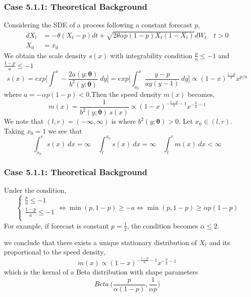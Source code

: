 \documentclass[aspectratio=169]{beamer}\usepackage[utf8]{inputenc}
\begin{document}
\begin{frame}\frametitle{ Case 5.1.1: Theoretical Background }
Considering the  SDE of a process following a constant forecast $p$,
\begin{equation}
\begin{split}
dX_t &= -\theta(X_t - p) dt + \sqrt{2 \theta \alpha p(1-p) X_t (1-X_t)} dW_t \quad t > 0 \\
X_0 & = x_0
\end{split}\label{main}
\end{equation}
We obtain the scale density $s(x)$ with integrability condition $\frac{p}{a} \leq -1 $ and $\frac{1-p}{a} \leq -1$
\begin{equation}
s(x) = exp \Big[ \int^x - \frac{2  a(y; \bm{\theta})}{b^2 (y; \bm{\theta} )}\ dy \Big] = exp \Big[ \int^x_{x_0}  \frac{y-p}{a y (y-1)}\ dy \Big]  \propto (1-x)^{\frac{1-p}{a}} x^{p/a}
\end{equation}
where $a= - \alpha p(1-p) <0$.Then the speed density $m(x)$ becomes, 
\begin{equation}
m(x) = \frac{1}{b^2 (y; \bm{\theta}) \  s(x)} \propto (1-x)^{-\frac{1-p}{a}-1} x^{-\frac{p}{a}-1}
\end{equation}
We note that $(l,r) = (-\infty, \infty)$ is where $b^2 (y; \bm{\theta} ) >0$. Let $x_0 \in (l,r)$. Taking $x_0=1$ we see that
\begin{equation}
\int_{x_0}^r s(x) \ dx = \infty \quad \int_{l}^{x_0} s(x) \ dx = \infty \quad \int_l^r m(x) \ dx < \infty
\end{equation}
\end{frame}

\begin{frame}\frametitle{ Case 5.1.1: Theoretical Background }
Under the condition,
\begin{equation}
\begin{cases}
\frac{p}{a} \leq -1\\
\frac{1-p}{a} \leq -1\\
\end{cases}\iff
\min (p, 1-p) \geq -a \iff  \min (p, 1-p) \geq \alpha p(1-p)
\end{equation}
For example, if forecast is constant $ p = \frac{1}{2}$, the condition becomes $\alpha \leq 2$.

we conclude that there exists a unique stationary distribution of  $X_t$ and its proportional to the speed density,
\begin{equation}
m(x)\propto (1-x)^{-\frac{1-p}{a}-1} x^{-\frac{p}{a}-1}
\end{equation}
 which is the kernal of a Beta distribution with shape parameters
\begin{equation}
  Beta \ \Big( \frac{p}{\alpha (1-p)}, \frac{1}{\alpha p } \Big)
\end{equation}
\end{frame}
\end{document}
